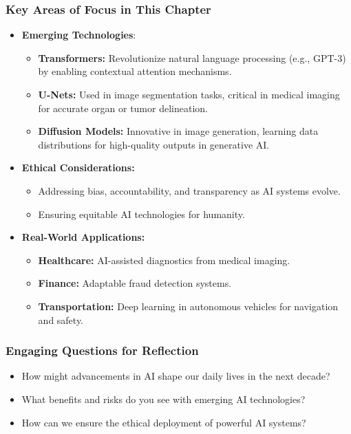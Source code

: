 \documentclass[aspectratio=169]{beamer}
\begin{document}
\begin{frame}[fragile]
    \frametitle{Key Areas of Focus in This Chapter}
    \begin{itemize}
        \item \textbf{Emerging Technologies}:
        \begin{itemize}
            \item \textbf{Transformers:} Revolutionize natural language processing (e.g., GPT-3) by enabling contextual attention mechanisms.
            \item \textbf{U-Nets:} Used in image segmentation tasks, critical in medical imaging for accurate organ or tumor delineation.
            \item \textbf{Diffusion Models:} Innovative in image generation, learning data distributions for high-quality outputs in generative AI.
        \end{itemize}
        
        \item \textbf{Ethical Considerations:}
        \begin{itemize}
            \item Addressing bias, accountability, and transparency as AI systems evolve.
            \item Ensuring equitable AI technologies for humanity.
        \end{itemize}
        
        \item \textbf{Real-World Applications:}
        \begin{itemize}
            \item \textbf{Healthcare:} AI-assisted diagnostics from medical imaging.
            \item \textbf{Finance:} Adaptable fraud detection systems.
            \item \textbf{Transportation:} Deep learning in autonomous vehicles for navigation and safety.
        \end{itemize}
    \end{itemize}
\end{frame}

\begin{frame}[fragile]
    \frametitle{Engaging Questions for Reflection}
    \begin{itemize}
        \item How might advancements in AI shape our daily lives in the next decade?
        \item What benefits and risks do you see with emerging AI technologies?
        \item How can we ensure the ethical deployment of powerful AI systems?
    \end{itemize}
\end{frame}
\end{document}
